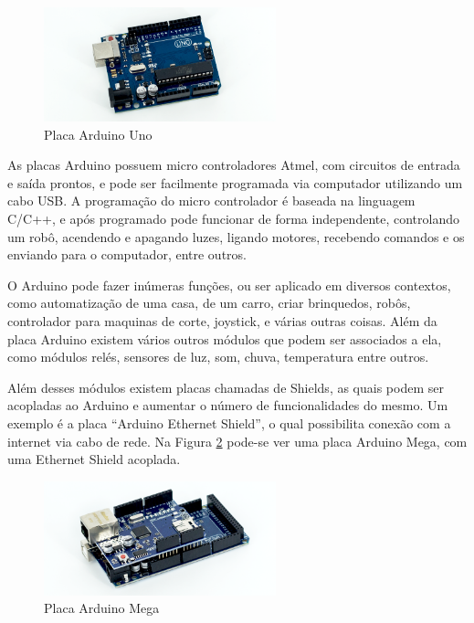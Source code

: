 \documentclass[
	12pt,			%
	openright,		%
	oneside,			%
	a4paper,			%
	chapter=TITLE,		%
	english,			%
	brazil,			%
	]{abntex2}
\begin{document}
\begin{figure}[H]
	\centering
		\includegraphics[width=0.6\textwidth]{./img/img-16.png}
		\caption{Placa Arduino Uno}
		\label{img:img-16}
\end{figure}

As placas Arduino possuem micro controladores Atmel, com circuitos de entrada e saída prontos, e pode ser facilmente programada via computador utilizando um cabo USB. A programação do micro controlador é baseada na linguagem C/C++, e após programado pode funcionar de forma independente, controlando um robô, acendendo e apagando luzes, ligando motores, recebendo comandos e os enviando para o computador, entre outros.

O Arduino pode fazer inúmeras funções, ou ser aplicado em diversos contextos, como automatização de uma casa, de um carro, criar brinquedos, robôs, controlador para maquinas de corte, joystick, e várias outras coisas. Além da placa Arduino existem vários outros módulos que podem ser associados a ela, como módulos relés, sensores de luz, som, chuva, temperatura entre outros.

Além desses módulos existem placas chamadas de Shields, as quais podem ser acopladas ao Arduino e aumentar o número de funcionalidades do mesmo. Um exemplo é a placa “Arduino Ethernet Shield”, o qual possibilita conexão com a internet via cabo de rede. Na Figura \ref{img:img-15}  pode-se ver uma placa Arduino Mega, com uma Ethernet Shield acoplada.

\begin{figure}[H]
	\centering
		\includegraphics[width=0.6\textwidth]{./img/img-15.png}
		\caption{Placa Arduino Mega}
		\label{img:img-15}
\end{figure}
\end{document}
